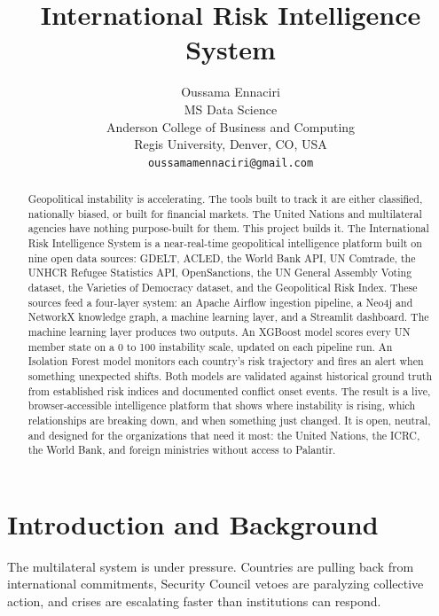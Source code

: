 \documentclass[12pt, onecolumn]{IEEEtran}
\begin{document}
\title{International Risk Intelligence System}

\author{Oussama Ennaciri \\
MS Data Science \\
Anderson College of Business and Computing \\
Regis University, Denver, CO, USA \\
\texttt{oussamamennaciri@gmail.com}}

\maketitle


\begin{abstract}
Geopolitical instability is accelerating. The tools built to track it are either classified, nationally biased, or built for financial markets. The United Nations and multilateral agencies have nothing purpose-built for them. This project builds it. The International Risk Intelligence System is a near-real-time geopolitical intelligence platform built on nine open data sources: GDELT, ACLED, the World Bank API, UN Comtrade, the UNHCR Refugee Statistics API, OpenSanctions, the UN General Assembly Voting dataset, the Varieties of Democracy dataset, and the Geopolitical Risk Index. These sources feed a four-layer system: an Apache Airflow ingestion pipeline, a Neo4j and NetworkX knowledge graph, a machine learning layer, and a Streamlit dashboard. The machine learning layer produces two outputs. An XGBoost model scores every UN member state on a 0 to 100 instability scale, updated on each pipeline run. An Isolation Forest model monitors each country's risk trajectory and fires an alert when something unexpected shifts. Both models are validated against historical ground truth from established risk indices and documented conflict onset events. The result is a live, browser-accessible intelligence platform that shows where instability is rising, which relationships are breaking down, and when something just changed. It is open, neutral, and designed for the organizations that need it most: the United Nations, the ICRC, the World Bank, and foreign ministries without access to Palantir.
\end{abstract}


\section{Introduction and Background}

The multilateral system is under pressure. Countries are pulling back from international commitments, Security Council vetoes are paralyzing collective action, and crises are escalating faster than institutions can respond.
\end{document}
